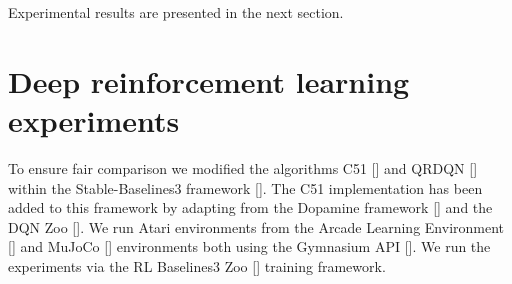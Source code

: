 \documentclass{article}
\DeclareMathOperator{\argmax}{arg\,max}
\theoremstyle{plain}
\theoremstyle{definition}
\theoremstyle{remark}
\begin{document}

Experimental results are presented in the next section.

\newpage

\section{Deep reinforcement learning experiments}\label{app:experiments}

To ensure fair comparison we modified the algorithms C51 [\cite{bellemare2017}] and QRDQN [\cite{dabney2018}] within the Stable-Baselines3 framework [\cite{sb3}]. The C51 implementation has been added to this framework by adapting from the Dopamine framework [\cite{dopamine}] and the DQN Zoo [\cite{dqnzoo}]. We run Atari environments from the Arcade Learning Environment [\cite{ale}] and MuJoCo [\cite{mujuco}] environments both using the Gymnasium API [\cite{gymnasium}]. We run the experiments via the RL Baselines3 Zoo [\cite{rl-zoo3}] training framework.
\end{document}
